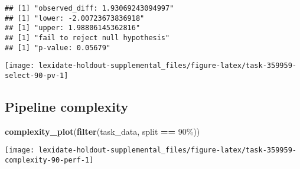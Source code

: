 \documentclass[
]{book}
\newenvironment{Shaded}{\begin{snugshade}}{\end{snugshade}}
\newcommand{\AttributeTok}[1]{\textcolor[rgb]{0.13,0.29,0.53}{#1}}
\newcommand{\DecValTok}[1]{\textcolor[rgb]{0.00,0.00,0.81}{#1}}
\newcommand{\FunctionTok}[1]{\textcolor[rgb]{0.13,0.29,0.53}{\textbf{#1}}}
\newcommand{\NormalTok}[1]{#1}
\newcommand{\OtherTok}[1]{\textcolor[rgb]{0.56,0.35,0.01}{#1}}
\newcommand{\SpecialCharTok}[1]{\textcolor[rgb]{0.81,0.36,0.00}{\textbf{#1}}}
\newcommand{\StringTok}[1]{\textcolor[rgb]{0.31,0.60,0.02}{#1}}
\begin{document}
\begin{Shaded}
\end{Shaded}

\begin{verbatim}
## [1] "observed_diff: 1.93069243094997"
## [1] "lower: -2.00723673836918"
## [1] "upper: 1.98806145362816"
## [1] "fail to reject null hypothesis"
## [1] "p-value: 0.05679"
\end{verbatim}

\texttt{[image: lexidate-holdout-supplemental\_files/figure-latex/task-359959-select-90-pv-1]}

\hypertarget{pipeline-complexity-36}{%
\subsection{Pipeline complexity}\label{pipeline-complexity-36}}

\begin{Shaded}
\begin{Highlighting}[]
\FunctionTok{complexity\_plot}\NormalTok{(}\FunctionTok{filter}\NormalTok{(task\_data, split }\SpecialCharTok{==} \StringTok{\textquotesingle{}90\%\textquotesingle{}}\NormalTok{))}
\end{Highlighting}
\end{Shaded}

\texttt{[image: lexidate-holdout-supplemental\_files/figure-latex/task-359959-complexity-90-perf-1]}
\end{document}

